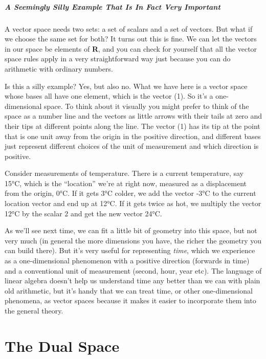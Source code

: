 \documentclass[oneside,english]{amsbook}
\numberwithin{section}{chapter}
\theoremstyle{plain}
\theoremstyle{definition}
\begin{document}
\paragraph{A Seemingly Silly Example That Is In Fact Very Important}

A vector space needs two sets: a set of scalars and a set of vectors.
But what if we choose the same set for both? It turns out this is fine.
We can let the vectors in our space be elements of \textbf{R}, and you
can check for yourself that all the vector space rules apply in a very
straightforward way just because you can do arithmetic with ordinary
numbers.

Is this a silly example? Yes, but also no. What we have here is a vector
space whose bases all have one element, which is the vector (1). So it's
a one-dimensional space. To think about it visually you might prefer to
think of the space as a number line and the vectors as little arrows
with their tails at zero and their tips at different points along the
line. The vector (1) has its tip at the point that is one unit away from
the origin in the positive direction, and different bases just represent
different choices of the unit of measurement and which direction is
positive.

Consider measurements of temperature. There is a current temperature,
say 15°C, which is the ``location'' we're at right now, measured as a
displacement from the origin, 0°C. If it gets 3°C colder, we add the
vector -3°C to the current location vector and end up at 12°C. If it
gets twice as hot, we multiply the vector 12°C by the scalar 2 and get
the new vector 24°C.

As we'll see next time, we can fit a little bit of geometry into this
space, but not very much (in general the more dimensions you have, the
richer the geometry you can build there). But it's very useful for
representing \emph{time}, which we experience as a one-dimensional
phenomenon with a positive direction (forwards in time) and a
conventional unit of measurement (second, hour, year etc). The language
of linear algebra doesn't help us understand time any better than we can
with plain old arithmetic, but it's handy that we can treat time, or
other one-dimensional phenomena, as vector spaces because it makes it
easier to incorporate them into the general theory.

\chapter{The Dual Space}
\end{document}
